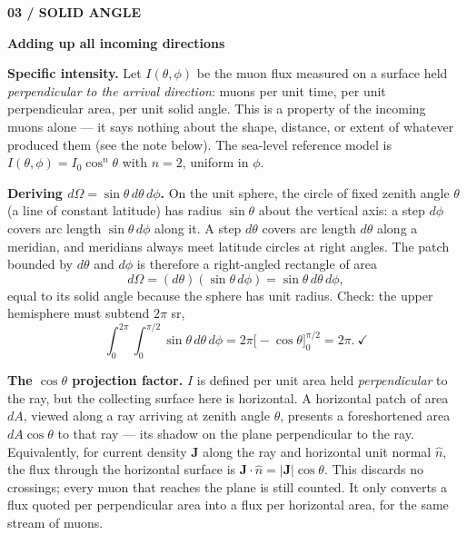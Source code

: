 \documentclass[11pt,a4paper]{article}
\newcommand{\pageheading}[2]{{\color{teal}\small\bfseries #1}\par
{\color{ink}\LARGE\bfseries #2}\par\vspace{5pt}}
\begin{document}
\newpage
\pageheading{03 / SOLID ANGLE}{Adding up all incoming directions}
\begin{center}
\end{center}
\textbf{Specific intensity.} Let $I(\theta,\phi)$ be the muon flux measured on a
surface held \emph{perpendicular to the arrival direction}: muons per unit time,
per unit perpendicular area, per unit solid angle. This is a property of the
incoming muons alone --- it says nothing about the shape, distance, or extent of
whatever produced them (see the note below). The sea-level reference model is
$I(\theta,\phi)=I_0\cos^n\theta$ with $n=2$, uniform in $\phi$.

\textbf{Deriving $d\Omega=\sin\theta\,d\theta\,d\phi$.} On the unit sphere, the
circle of fixed zenith angle $\theta$ (a line of constant latitude) has radius
$\sin\theta$ about the vertical axis: a step $d\phi$ covers arc length
$\sin\theta\,d\phi$ along it. A step $d\theta$ covers arc length $d\theta$ along
a meridian, and meridians always meet latitude circles at right angles. The
patch bounded by $d\theta$ and $d\phi$ is therefore a right-angled rectangle of
area
\[
d\Omega=(d\theta)(\sin\theta\,d\phi)=\sin\theta\,d\theta\,d\phi,
\]
equal to its solid angle because the sphere has unit radius. Check: the upper
hemisphere must subtend $2\pi$ sr,
\[
\int_0^{2\pi}\!\!\int_0^{\pi/2}\sin\theta\,d\theta\,d\phi
=2\pi\big[-\cos\theta\big]_0^{\pi/2}=2\pi.\ \checkmark
\]

\textbf{The $\cos\theta$ projection factor.} $I$ is defined per unit area held
\emph{perpendicular} to the ray, but the collecting surface here is horizontal.
A horizontal patch of area $dA$, viewed along a ray arriving at zenith angle
$\theta$, presents a foreshortened area $dA\cos\theta$ to that ray --- its
shadow on the plane perpendicular to the ray. Equivalently, for current density
$\mathbf J$ along the ray and horizontal unit normal $\hat n$, the flux through
the horizontal surface is $\mathbf J\cdot\hat n=|\mathbf J|\cos\theta$. This
discards no crossings; every muon that reaches the plane is still counted. It
only converts a flux quoted per perpendicular area into a flux per horizontal
area, for the same stream of muons.
\end{document}
